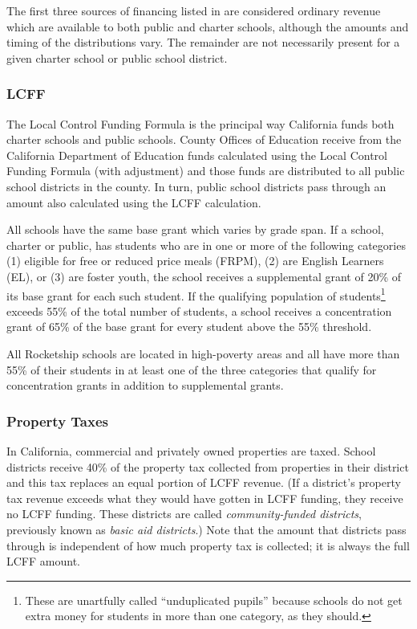 The first three sources of financing listed in  are considered ordinary revenue which are available to both public and charter schools, although the amounts and timing of the distributions vary. The remainder are not necessarily present for a given charter school or public school district.

\subsubsection{LCFF}
\label{sec:lcff}\indent%

The Local Control Funding Formula is the principal way California funds both charter schools and public schools. County Offices of Education receive from the California Department of Education funds calculated using the Local Control Funding Formula (with adjustment) and those funds are distributed to all public school districts in the county. In turn, public school districts pass through an amount also calculated using the LCFF calculation.

All schools have the same base grant which varies by grade span. If a school, charter or public, has students who are in one or more of the following categories (1) eligible for free or reduced price meals (FRPM), (2) are English Learners (EL), or (3) are foster youth, the school receives a supplemental grant of 20\% of its base grant for each such student. If the qualifying population of students\footnote{These are unartfully called ``unduplicated pupils'' because schools do not get extra money for students in more than one category, as they should.} exceeds 55\% of the total number of students, a school receives a concentration grant of 65\% of the base grant for every student above the 55\% threshold.

All Rocketship schools are located in high-poverty areas and all have more than 55\% of their students in at least one of the three categories that qualify for concentration grants in addition to supplemental grants. 

\subsubsection{Property Taxes}
\label{sec:property-taxes}\indent%

In California, commercial and privately owned properties are taxed. School districts receive 40\% of the property tax collected from properties in their district and this tax replaces an equal portion of LCFF revenue. (If a district's property tax revenue exceeds what they would have gotten in LCFF funding, they receive no LCFF funding. These districts are called \textit{community-funded districts}, previously known as \textit{basic aid districts}.) Note that the amount that districts pass through is independent of how much property tax is collected; it is always the full LCFF amount.

